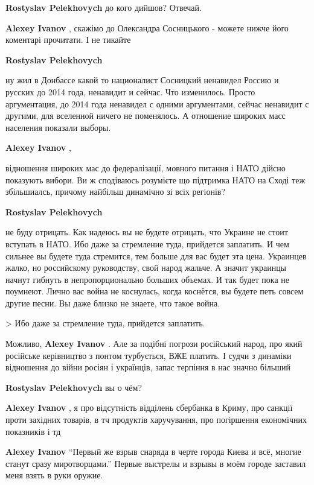 \begin{itemize}
\begin{itemize}
\textbf{Rostyslav Pelekhovych} до кого дийшов? Отвечай.

\textbf{Alexey Ivanov} , скажімо до Олександра Сосницького - можете нижче його коментарі прочитати. І не тикайте

\textbf{Rostyslav Pelekhovych} 

ну жил в Донбассе какой то националист Сосницкий ненавидел Россию и русских до
2014 года, ненавидит и сейчас. Что изменилось. Просто аргументация, до 2014
года ненавидел с одними аргументами, сейчас ненавидит с другими, для вселенной
ничего не поменялось. А отношение широких масс населения показали выборы.


\textbf{Alexey Ivanov} , 

відношення широких мас до федералізації, мовного питання і НАТО дійсно
показують вибори. Ви ж сподіваюсь розумієте що підтримка НАТО на Сході теж
збільшиалсь, причому найбільш динамічно зі всіх регіонів?

\textbf{Rostyslav Pelekhovych} 

не буду отрицать. Как надеюсь вы не будете отрицать, что Украине не стоит
вступать в НАТО. Ибо даже за стремление туда, прийдется заплатить. И чем
сильнее вы будете туда стремится, тем больше для вас будет эта цена. Украинцев
жалко, но российскому руководству, свой народ жальче. А значит украинцы начнут
гибнуть в непропорционально больших объемах. И так будет пока не поумнеют.
Лично вас война не коснулась, когда коснётся, вы будете петь совсем другие
песни. Вы даже близко не знаете, что такое война.

> Ибо даже за стремление туда, прийдется заплатить.

Можливо, \textbf{Alexey Ivanov} . Але за подібні погрози російський народ, про який
російське керівництво з понтом турбується, ВЖЕ платить. І судчи з динаміки
відношення до війни росіян і українців, запас терпіння в нас значно більший

\textbf{Rostyslav Pelekhovych} вы о чём?

\textbf{Alexey Ivanov} , я про відсутність відділень сбербанка в Криму, про санкції проти західних товарів, в тч продуктів харучування, про погіршення економічних показників і тд

\textbf{Alexey Ivanov} \enquote{Первый же взрыв снаряда в черте города Киева и всё, многие станут сразу миротворцами.}
Первые выстрелы и взрывы в моём городе заставил меня взять в руки оружие.


\end{itemize}
\end{itemize}
